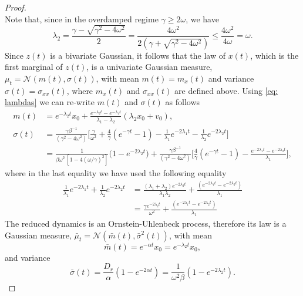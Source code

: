 \documentclass[a4paper,twoside]{article}      %
\theoremstyle{definition}
\begin{document}
\begin{proof}
\begin{equation}
\end{equation}
Note that, since in the overdamped regime $\gamma\geq 2\omega$, we have
$$
\lambda_2=\frac{\gamma- \sqrt{\gamma^2-4\omega^2}}{2}=\frac{4\omega^2}{2(\gamma+\sqrt{\gamma^2-4\omega^2})}\leq \frac{4\omega^2}{4\omega}=\omega.
$$
Since $z(t)$ is a bivariate Gaussian, it follows that the law of $x(t)$, which is the first marginal of $z(t)$, is a univariate Gaussian measure, $\mu_t=\mathcal{N}(m(t),\sigma(t))$, with mean $m(t)=m_x(t)$ and variance $\sigma(t)=\sigma_{xx}(t)$, where $m_x(t)$ and $\sigma_{xx}(t)$ are defined above. Using \eqref{eq: lambdas} we can re-write $m(t)$ and $\sigma(t)$ as follows
\begin{align}
\label{eq: sigmaxx}
m(t)&=e^{-\lambda_2 t}x_0+\frac{e^{-\lambda_2 t}-e^{-\lambda_1 t}}{\lambda_1-\lambda_2}(\lambda_2 x_0+ v_0),\\
\sigma(t)&=\frac{\gamma\beta^{-1}}{(\gamma^2-4\omega^2)}\Big[\frac{\gamma}{\omega^2}+\frac{4}{\gamma}(e^{-\gamma t}-1)-\frac{1}{\lambda_1}e^{-2\lambda_1 t}-\frac{1}{\lambda_2}e^{-2\lambda_2 t}\Big]
\\&=\frac{1}{\beta \omega^2\,[1-4(\omega/\gamma)^2]}\big(1-e^{-2\lambda_2 t}\big)+\frac{\gamma\beta^{-1}}{(\gamma^2-4\omega^2)}\Big[\frac{4}{\gamma}(e^{-\gamma t}-1)-\frac{e^{-2\lambda_1 t}-e^{-2\lambda_2 t}}{\lambda_1}\Big],
\end{align}
where in the last equality we have used the following equality
\begin{align*}
\frac{1}{\lambda_1}e^{-2\lambda_1 t}+\frac{1}{\lambda_2}e^{-2\lambda_2 t}&=\frac{(\lambda_1+\lambda_2)e^{-2\lambda_2 t}}{\lambda_1 \lambda_2}+\frac{(e^{-2\lambda_1 t}-e^{-2\lambda_2 t})}{\lambda_1}
\\&=\frac{\gamma e^{-2\lambda_2 t}}{\omega^2}+\frac{(e^{-2\lambda_1 t}-e^{-2\lambda_2t})}{\lambda_1}
\end{align*}
The reduced dynamics is an Ornstein-Uhlenbeck process, therefore its law is a Gaussian measure, $\bar{\mu}_t=\mathcal{N}(\bar{m}(t),\bar{\sigma}^2(t))$, with mean
\begin{equation}
\bar{m}(t)=e^{-\alpha t} x_0=e^{-\lambda_2 t}x_0,
\end{equation}
and variance 
\begin{equation}
\bar{\sigma}(t)=\frac{D_r}{\alpha}(1-e^{-2\alpha t})=\frac{1}{\omega^2 \beta}(1-e^{-2\lambda_2 t}).
\end{equation}

\end{proof}
\end{document}
